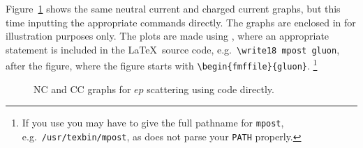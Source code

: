 Figure~\ref{fig:nccc-feynmf} shows the same neutral current and
charged current graphs, but this time inputting the appropriate
 commands directly. The graphs are enclosed in
 for illustration purposes only.
The plots are made using ,
where an appropriate
 statement is included in the \LaTeX\ source code,
e.g.\ \verb+\write18 mpost gluon+, after the figure, where the figure
starts with \verb+\begin{fmffile}{gluon}+.%
\footnote{If you use \TeXstudio you may have to give the full pathname for \texttt{mpost},
  e.g.\ \texttt{/usr/texbin/mpost}, as \TeXstudio does not parse your \texttt{PATH} properly.}

\begin{figure}[htbp]
  \centering
  \fbox{}
   {%
  }{
  }
  \qquad
  \fbox{}
   {%
  }{
  }
  \caption{NC and CC graphs for \(ep\) scattering using 
    code directly.}
  \label{fig:nccc-feynmf}
\end{figure}

